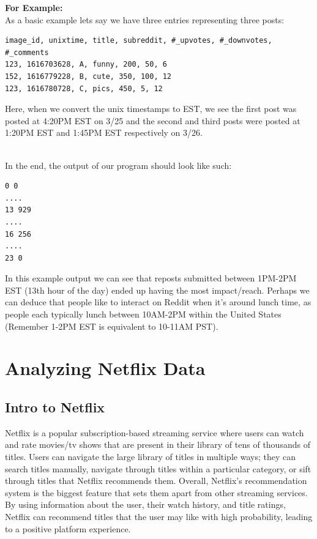 \documentclass{article}
\begin{document}
\noindent \textbf{For Example:}\\
As a basic example lets say we have three entries representing three posts: 
\begin{Verbatim}[frame=single]
image_id, unixtime, title, subreddit, #_upvotes, #_downvotes, #_comments
123, 1616703628, A, funny, 200, 50, 6
152, 1616779228, B, cute, 350, 100, 12
123, 1616780728, C, pics, 450, 5, 12
\end{Verbatim}
Here, when we convert the unix timestamps to EST, we see the first post was posted at 4:20PM EST on 3/25 and the second and third posts were posted at 1:20PM EST and 1:45PM EST respectively on 3/26.


\-\ \\In the end, the output of our program should look like such:
\begin{Verbatim}[frame=single]
0 0
....
13 929
....
16 256
....
23 0
\end{Verbatim}
In this example output we can see that reposts submitted between 1PM-2PM EST (13th hour of the day) ended up having the most impact/reach. Perhaps we can deduce that people like to interact on Reddit when it's around lunch time, as people each typically lunch between 10AM-2PM within the United States (Remember 1-2PM EST is equivalent to 10-11AM PST). 

\newpage
\section{Analyzing Netflix Data}
\subsection*{Intro to Netflix}
Netflix is a popular subscription-based streaming service where users can watch and rate movies/tv shows that are present in their library of tens of thousands of titles. Users can navigate the large library of titles in multiple ways; they can search titles manually, navigate through titles within a particular category, or sift through titles that Netflix recommends them. Overall, Netflix's recommendation system is the biggest feature that sets them apart from other streaming services. By using information about the user, their watch history, and title ratings, Netflix can recommend titles that the user may like with high probability, leading to a positive platform experience. 
\end{document}
